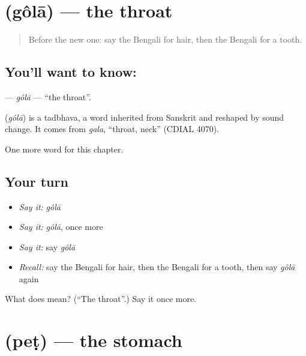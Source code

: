 \section[\texorpdfstring{\bn{গলা} (gôlā)}{গলা (gôlā)}]{ (gôlā) — the throat}

\label{lesson:BN-C42-gola}



\begin{quote}
Before the new one: say the Bengali for hair, then the Bengali for a tooth.
\end{quote}

\subsection*{You'll want to know: }
\textbf{} — \emph{gôlā} — \textquotedblleft{}the throat\textquotedblright{}.

\begin{cousinweb}
\textbf{} (\emph{gôlā}) is a tadbhava, a word inherited from Sanskrit and reshaped by sound change. It comes from \emph{gala}, \textquotedblleft{}throat, neck\textquotedblright{} (CDIAL 4070).
\end{cousinweb}

\begin{grammarlens}[title={What you've built}]
One more word for this chapter.
\end{grammarlens}

\subsection*{Your turn}
\begin{itemize}
\raggedright
  \item \emph{Say it:} \emph{gôlā}
  \item \emph{Say it:} \emph{gôlā}, once more
  \item \emph{Say it:} say \emph{gôlā}
  \item \emph{Recall:} say the Bengali for hair, then the Bengali for a tooth, then say \emph{gôlā} again
\end{itemize}

\begin{tcolorbox}[breakable,colback=teal!4,colframe=teal!35!black,title={Before you move on}]
What does  mean? (\textquotedblleft{}The throat\textquotedblright{}.) Say it once more.
\end{tcolorbox}
\section[\texorpdfstring{\bn{পেট} (peṭ)}{পেট (peṭ)}]{ (peṭ) — the stomach}


